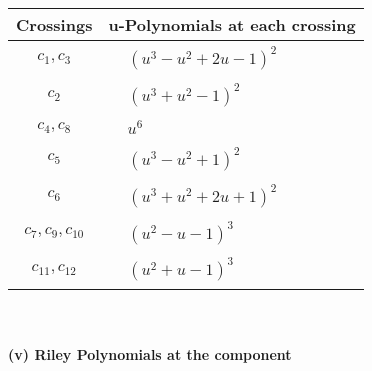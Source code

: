 \documentclass[1p]{elsarticle_modified}
\theoremstyle{definition}
\begin{document}
\begin{tabular}{m{50pt}|m{274pt}}
Crossings & \hspace{64pt}u-Polynomials at each crossing \\
\hline $$\begin{aligned}c_{1},c_{3}\end{aligned}$$&$\begin{aligned}
&(u^3- u^2+2 u-1)^2
\end{aligned}$\\
\hline $$\begin{aligned}c_{2}\end{aligned}$$&$\begin{aligned}
&(u^3+u^2-1)^2
\end{aligned}$\\
\hline $$\begin{aligned}c_{4},c_{8}\end{aligned}$$&$\begin{aligned}
&u^6
\end{aligned}$\\
\hline $$\begin{aligned}c_{5}\end{aligned}$$&$\begin{aligned}
&(u^3- u^2+1)^2
\end{aligned}$\\
\hline $$\begin{aligned}c_{6}\end{aligned}$$&$\begin{aligned}
&(u^3+u^2+2 u+1)^2
\end{aligned}$\\
\hline $$\begin{aligned}c_{7},c_{9},c_{10}\end{aligned}$$&$\begin{aligned}
&(u^2- u-1)^3
\end{aligned}$\\
\hline $$\begin{aligned}c_{11},c_{12}\end{aligned}$$&$\begin{aligned}
&(u^2+u-1)^3
\end{aligned}$\\
\hline
\end{tabular}\\~\\
\newpage\renewcommand{\arraystretch}{1}
\flushleft \textbf{(v) Riley Polynomials at the component}\newline \\
\end{document}
